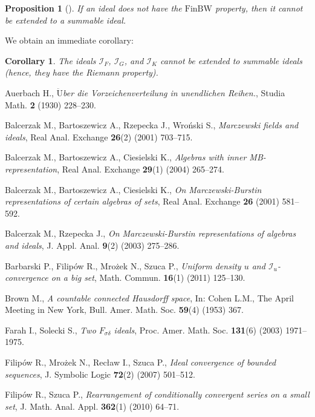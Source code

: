 \documentclass{amsart}
\newtheorem{prop}[thm]{Proposition}
\newtheorem{cor}[thm]{Corollary}
\theoremstyle{definition}
\newcommand{\I}{\mathcal I}
\newcommand{\finbw}{\text{FinBW}}
\begin{document}
\begin{prop}[{\cite[Corollary 3.5]{H3}}]
If an ideal does not have the $\finbw$ property, then it cannot be extended to a summable ideal.
\end{prop}

We obtain an immediate corollary:
\begin{cor}
The ideals $\I_F$, $\I_G$, and $\I_K$ cannot be extended to summable ideals (hence, they have the Riemann property).
\end{cor}



\begin{thebibliography}{abc}

Auerbach H., \emph{$\ddot{\textrm{U}}$ber die Vorzeichenverteilung in unendlichen Reihen.},
Studia Math. {\bf 2} (1930) 228--230.

Balcerzak M., Bartoszewicz A., Rzepecka J., Wro\'nski S., \emph{Marczewski fields and ideals},
Real Anal. Exchange {\bf 26}(2) (2001) 703--715.

Balcerzak M., Bartoszewicz A., Ciesielski K., \emph{Algebras with inner MB-representation},
Real Anal. Exchange {\bf 29}(1) (2004) 265--274.

Balcerzak M., Bartoszewicz A., Ciesielski K., \emph{On Marczewski-Burstin representations of certain algebras of sets},
Real Anal. Exchange {\bf 26} (2001) 581--592.

Balcerzak M., Rzepecka J., \emph{On Marczewski-Burstin representations of algebras and ideals},
J. Appl. Anal. {\bf 9}(2) (2003) 275--286.

Barbarski P., Filip\'ow R., Mro\.zek N., Szuca P., \emph{Uniform density $u$ and $\I_u$-convergence on a big set},
Math. Commun. {\bf 16}(1) (2011) 125--130.

Brown M., \emph{A countable connected Hausdorff space},
In: Cohen L.M., The April Meeting in New York, Bull. Amer. Math. Soc. {\bf 59}(4) (1953) 367.

Farah I., Solecki S., \emph{Two $F_{\sigma\delta}$ ideals},
Proc. Amer. Math. Soc. {\bf 131}(6) (2003) 1971--1975.

Filip\'ow R., Mro\.zek N., Rec\l{}aw I., Szuca P., \emph{Ideal convergence of bounded sequences},
J. Symbolic Logic {\bf 72}(2) (2007) 501--512.

Filip\'ow R., Szuca P., \emph{Rearrangement of conditionally convergent series on a small set},
J. Math. Anal. Appl. {\bf 362}(1) (2010) 64--71.


\end{thebibliography}
\end{document}
